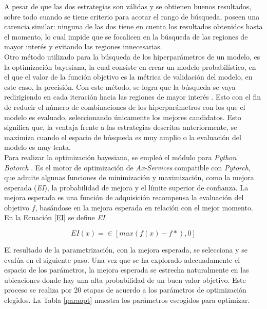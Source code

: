 A pesar de que las dos estrategias son válidas y se obtienen buenos resultados, sobre todo cuando se tiene criterio para acotar el rango de búsqueda, poseen una carencia similar: ninguna de las dos tiene en cuenta los resultados obtenidos hasta el momento, lo cual impide que se focalicen en la búsqueda de las regiones de mayor interés y evitando las regiones innecesarias.\\


Otro método utilizado para la búsqueda de los hiperparámetros de un modelo, es la optimización bayesiana, la cual consiste en crear un modelo probabilístico, en el que el valor de la función objetivo es la métrica de validación del modelo, en este caso, la precisión. Con este método, se logra que la búsqueda se vaya redirigiendo en cada iteración hacia las regiones de mayor interés \cite{frazier2018tutorial}. Esto con el fin de reducir el número de combinaciones de los hiperparámetros con los que el modelo es evaluado, seleccionando únicamente los mejores candidatos. Esto significa que, la ventaja frente a las estrategias descritas anteriormente, se maximiza cuando el espacio de búsqueda es muy amplio o la evaluación del modelo es muy lenta.\\

Para realizar la optimización bayesiana, se empleó el módulo para \textit{Python} \textit{Botorch}  \cite{balandat2020botorch}. Es el motor de optimización de \textit{Ax-Services} compatible con \textit{Pytorch}, que admite algunas funciones de minimización y maximización, como la mejora esperada (\textit{EI}), la probabilidad de mejora y el límite superior de confianza. La mejora esperada es una función de adquisición recompensa la evaluación del objetivo $f$, basándose en la mejora esperada en relación con el mejor momento. En la Ecuación \ref{EI} se define  \textit{EI}.

\begin{equation}
	{EI(x)=\in[max(f(x)-f*),0]}
	\label{EI}
\end{equation}

El resultado de la parametrización, con la mejora esperada, se selecciona y se evalúa en el siguiente paso. Una vez que se ha explorado adecuadamente el espacio de los parámetros, la mejora esperada se estrecha naturalmente en las ubicaciones donde hay una alta probabilidad de un buen valor objetivo. Este proceso se realiza por 20 etapas de acuerdo a los parámetros de optimización elegidos. La Tabla \ref{paraopt} muestra los parámetros escogidos para optimizar.


